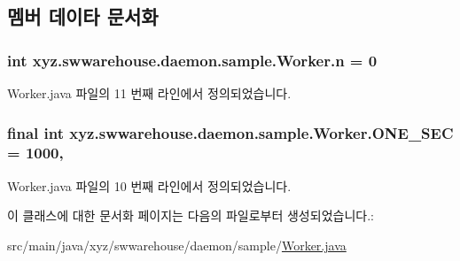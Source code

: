 \subsection{멤버 데이타 문서화}
\hypertarget{classxyz_1_1swwarehouse_1_1daemon_1_1sample_1_1_worker_aba3c26c1febb4e19bfc9562306bcee80}{
\subsubsection[{n}]{\setlength{\rightskip}{0pt plus 5cm}int xyz.\+swwarehouse.\+daemon.\+sample.\+Worker.\+n = 0\hspace{0.3cm}{\ttfamily [private]}}}\label{classxyz_1_1swwarehouse_1_1daemon_1_1sample_1_1_worker_aba3c26c1febb4e19bfc9562306bcee80}


Worker.\+java 파일의 11 번째 라인에서 정의되었습니다.

\hypertarget{classxyz_1_1swwarehouse_1_1daemon_1_1sample_1_1_worker_a285c9ea5eebf4bb083140ca18048961a}{
\subsubsection[{O\+N\+E\+\_\+\+S\+E\+C}]{\setlength{\rightskip}{0pt plus 5cm}final int xyz.\+swwarehouse.\+daemon.\+sample.\+Worker.\+O\+N\+E\+\_\+\+S\+E\+C = 1000\hspace{0.3cm}{\ttfamily [static]}, {\ttfamily [private]}}}\label{classxyz_1_1swwarehouse_1_1daemon_1_1sample_1_1_worker_a285c9ea5eebf4bb083140ca18048961a}


Worker.\+java 파일의 10 번째 라인에서 정의되었습니다.



이 클래스에 대한 문서화 페이지는 다음의 파일로부터 생성되었습니다.\+:\begin{DoxyCompactItemize}
\item 
src/main/java/xyz/swwarehouse/daemon/sample/\hyperlink{_worker_8java}{Worker.\+java}\end{DoxyCompactItemize}
